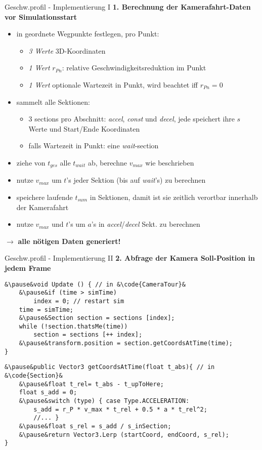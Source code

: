 \begin{frame}{Geschw.profil - Implementierung I}
	\textbf{1. Berechnung der Kamerafahrt-Daten vor Simulationsstart}
	\begin{itemize}
		\pause\item in  geordnete Wegpunkte festlegen, pro Punkt:
		\begin{itemize}
			\pause\item {\tiny\textit{3 Werte}} 3D-Koordinaten
			\pause\item {\tiny\textit{1 Wert}} $r_{Pn}$: relative Geschwindigkeitsreduktion im Punkt
			\pause\item {\tiny\textit{1 Wert}} optionale Wartezeit in Punkt, wird beachtet iff $r_{Pn} = 0$
		\end{itemize}
		\pause\item {} sammelt alle Sektionen:
		\begin{itemize}
			\pause\item 3 sections pro Abschnitt: \textit{accel}, \textit{const} und \textit{decel}\pause, jede speichert ihre $s$ Werte und Start/Ende Koordinaten
			\pause\item falls Wartezeit in Punkt: eine \textit{wait}-section
		\end{itemize}
		\pause\item ziehe von $t_{ges}$ alle $t_{wait}$ ab, berechne $v_{max}$ wie beschrieben
		\pause\item nutze $v_{max}$ um $t$'s jeder Sektion (bis auf \textit{wait}'s) zu berechnen
		\pause\item speichere laufende $t_{sum}$ in Sektionen, damit ist sie zeitlich verortbar innerhalb der Kamerafahrt
		\pause\item nutze $v_{max}$ und $t$'s um $a$'s in \textit{accel}/\textit{decel} Sekt. zu berechnen
	\end{itemize}
	\pause$\rightarrow$ \textbf{alle nötigen Daten generiert!}
\end{frame}


\begin{frame}[fragile]{Geschw.profil - Implementierung II}
\textbf{2. Abfrage der Kamera Soll-Position in jedem Frame}\\
\vspace{0.2cm}
\begin{lstlisting}
&\pause&void Update () { // in &\code{CameraTour}&
	&\pause&if (time > simTime)
		index = 0; // restart sim
	time = simTime;
	&\pause&Section section = sections [index];
	while (!section.thatsMe(time))
		section = sections [++ index];
	&\pause&transform.position = section.getCoordsAtTime(time);
}
\end{lstlisting}
\begin{lstlisting}
&\pause&public Vector3 getCoordsAtTime(float t_abs){ // in &\code{Section}&
	&\pause&float t_rel= t_abs - t_upToHere;
	float s_add = 0;
	&\pause&switch (type) { case Type.ACCELERATION:
		s_add = r_P * v_max * t_rel + 0.5 * a * t_rel^2;
		//... }
	&\pause&float s_rel = s_add / s_inSection;
	&\pause&return Vector3.Lerp (startCoord, endCoord, s_rel);
}
\end{lstlisting}
\end{frame}

